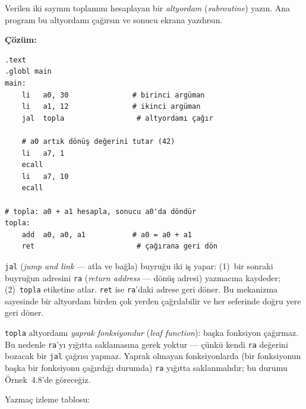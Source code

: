 \begin{ornek}[4.6]
\label{orn:altyordam-cagirma}
Verilen iki sayının toplamını hesaplayan bir \emph{altyordam} (\emph{subroutine}) yazın. Ana program bu altyordamı çağırsın ve sonucu ekrana yazdırsın.

\textbf{Çözüm:}

\begin{lstlisting}[style=riscv]
.text
.globl main
main:
    li   a0, 30               # birinci argüman
    li   a1, 12               # ikinci argüman
    jal  topla                 # altyordamı çağır

    # a0 artık dönüş değerini tutar (42)
    li   a7, 1
    ecall
    li   a7, 10
    ecall

# topla: a0 + a1 hesapla, sonucu a0'da döndür
topla:
    add  a0, a0, a1           # a0 = a0 + a1
    ret                        # çağırana geri dön
\end{lstlisting}

\texttt{jal} (\emph{jump and link} --- atla ve bağla) buyruğu iki iş yapar: (1)~bir sonraki buyruğun adresini \texttt{ra} (\emph{return address} --- dönüş adresi) yazmacına kaydeder; (2)~\texttt{topla} etiketine atlar. \texttt{ret} ise \texttt{ra}'daki adrese geri döner. Bu mekanizma sayesinde bir altyordam birden çok yerden çağrılabilir ve her seferinde doğru yere geri döner.

\texttt{topla} altyordamı \emph{yaprak fonksiyondur} (\emph{leaf function}): başka fonksiyon çağırmaz. Bu nedenle \texttt{ra}'yı yığıtta saklamasına gerek yoktur --- çünkü kendi \texttt{ra} değerini bozacak bir \texttt{jal} çağrısı yapmaz. Yaprak olmayan fonksiyonlarda (bir fonksiyonun başka bir fonksiyonu çağırdığı durumda) \texttt{ra} yığıtta saklanmalıdır; bu durumu Örnek~4.8'de göreceğiz.

Yazmaç izleme tablosu:


\end{ornek}
